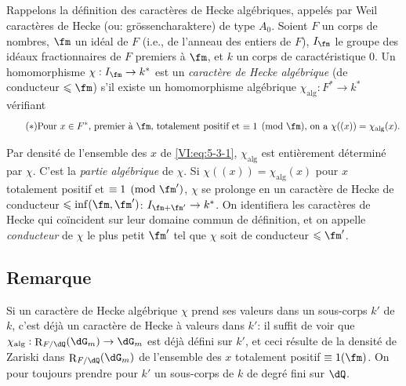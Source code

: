 \documentclass[oneside]{book}
\DeclareMathOperator{\res}{R} %
\newcounter{char}
\theoremstyle{sga-source}
\theoremstyle{sga-source-dash}
\theoremstyle{sga-source-dotdash}
\theoremstyle{sga-source-number-note-dash}
\theoremstyle{sga-source-note-number-dotdash}
\theoremstyle{sga-source-example-dotdash}
\theoremstyle{sga-source-inline-number}
\theoremstyle{sga-source-bare-number}
\theoremstyle{sga-source}
\newcommand{\PrintPage}[1]{}\newcommand{\MathPage}[1]{}\newcommand{\PrintCite}[2]{#1}\newcommand{\var}[3]{#1}
\begin{document}
\subsection{}\label{VI:5-3}

Rappelons la définition des caractères de Hecke algébriques, appelés 
par Weil caractères de Hecke (ou: gr\"ossencharaktere) de type $A_0$. Soient $F$ 
un corps de nombres, $\fm$ un idéal de $F$ (i.e., de l'anneau des entiers de 
$F$), $I_\fm$ le groupe des idéaux fractionnaires de $F$ premiers à $\fm$, 
et $k$ un corps de caractéristique $0$. Un homomorphisme 
$\chi:I_\fm \to k^\ast$ est un \emph{caractère de Hecke algébrique} (de 
conducteur $\leqslant \fm$) s'il existe un homomorphisme algébrique 
$\chi_\text{alg}:F^\ast \to k^\ast$ vérifiant 
\begin{equation*}\tag{$*$}\label{VI:eq:5-3-1}
\text{Pour $x\in F^\ast$, premier à $\fm$, totalement positif et 
$\equiv 1\pmod\fm$, on a $\chi((x))=\chi_\text{alg}(x)$.}
\end{equation*}

Par densité de l'ensemble des $x$ de \eqref{VI:eq:5-3-1}, $\chi_\text{alg}$ 
est entièrement déterminé par $\chi$. C'est la \emph{partie algébrique} 
de $\chi$. Si $\chi((x))=\chi_\text{alg}(x)$ pour $x$ totalement positif et 
$\equiv 1\pmod{\fm'}$, $\chi$ se prolonge en un caractère de Hecke de 
conducteur $\leqslant \inf(\fm,\fm')$: $I_{\fm+\fm'}\to k^\ast$. On 
identifiera les caractères de Hecke qui coïncident sur leur domaine commun de 
définition, et on appelle \emph{conducteur} de $\chi$ le plus petit $\fm'$ 
tel que $\chi$ soit de conducteur $\leqslant \fm'$. 





\PrintPage{210}
\subsection{Remarque}\label{VI:5-4}

Si un caractère de Hecke algébrique $\chi$ prend ses valeurs dans un 
sous-corps $k'$ de $k$, c'est déjà un caractère de Hecke à valeurs dans 
$k'$: il suffit de voir que $\chi_\text{alg}:\res_{F/\dQ}(\dG_m) \to \dG_m$ 
est déjà défini sur $k'$, et ceci résulte de la densité de Zariski 
dans $\res_{F/\dQ}(\dG_m)$ de l'ensemble \var{des $x$ totalement positif}{des $x$ totalement positifs}{S45-SOL-0875} 
$\equiv 1(\fm)$. \var{On pour toujours prendre}{On peut toujours prendre}{S45-SOL-0877} pour $k'$ un sous-corps de $k$ de 
degré fini sur $\dQ$. 
\end{document}
